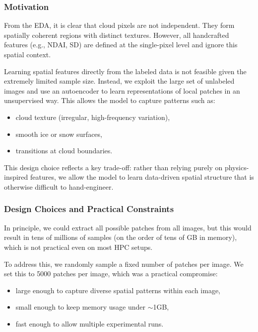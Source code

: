 \documentclass[10pt,letterpaper]{article}
\begin{document}
\subsubsection*{Motivation}

From the EDA, it is clear that cloud pixels are not independent. They form spatially coherent regions with distinct textures. However, all handcrafted features (e.g., NDAI, SD) are defined at the single-pixel level and ignore this spatial context.

Learning spatial features directly from the labeled data is not feasible given the extremely limited sample size. Instead, we exploit the large set of unlabeled images and use an autoencoder to learn representations of local patches in an unsupervised way. This allows the model to capture patterns such as:
\begin{itemize}
    \item cloud texture (irregular, high-frequency variation),
    \item smooth ice or snow surfaces,
    \item transitions at cloud boundaries.
\end{itemize}

This design choice reflects a key trade-off: rather than relying purely on physics-inspired features, we allow the model to learn data-driven spatial structure that is otherwise difficult to hand-engineer.

\subsubsection*{Design Choices and Practical Constraints}

In principle, we could extract all possible patches from all images, but this would result in tens of millions of samples (on the order of tens of GB in memory), which is not practical even on most HPC setups.

To address this, we randomly sample a fixed number of patches per image. We set this to 5000 patches per image, which was a practical compromise:
\begin{itemize}
    \item large enough to capture diverse spatial patterns within each image,
    \item small enough to keep memory usage under $\sim$1GB,
    \item fast enough to allow multiple experimental runs.
\end{itemize}
\end{document}
